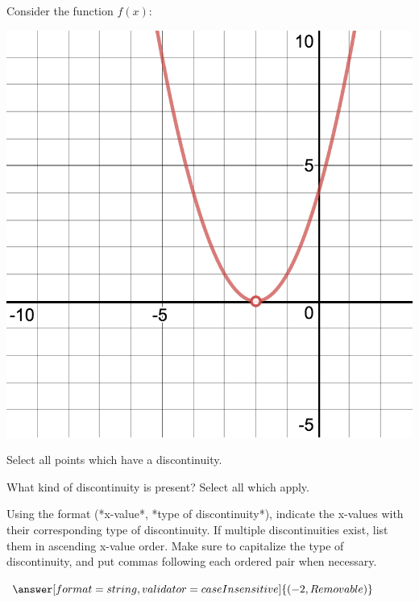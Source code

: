 \documentclass{ximera}
\begin{document}
\begin{question}
Consider the function $f(x)$:
\begin{image}
\includegraphics{continuity2}
\end{image}
Select all points which have a discontinuity.

\begin{selectAll}
\end{selectAll}

What kind of discontinuity is present? Select all which apply.

\begin{selectAll}
\end{selectAll}

Using the format (*x-value*, *type of discontinuity*), indicate the x-values with their corresponding type of discontinuity. If multiple discontinuities exist, list them in ascending x-value order. Make sure to capitalize the type of discontinuity, and put commas following each ordered pair when necessary.

$\answer[format=string,validator=caseInsensitive]{(-2, Removable)}$
\end{question}
\end{document}
